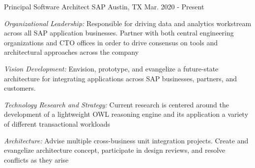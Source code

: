 


\begin{cventries}


\cventry
{Principal Software Architect}
{SAP}
{Austin, TX}
{Mar. 2020 - Present}
{
  \begin{cvitems}
  \item {\emph{Organizational Leadership:} Responsible for driving data and analytics workstream across all SAP application businesses. Partner with both central engineering organizations and CTO offices in order to drive consensus on tools and architectural approaches across the company }
  \item {\emph{Vision Development:} Envision, prototype, and evangelize a future-state architecture for integrating applications across SAP businesses, partners, and customers.}
  \item {\emph{Technology Research and Strategy:} Current research is centered around the development of a lightweight OWL reasoning engine and its application a variety of different transactional workloads }
  \item {\emph{Architecture:} Advise multiple cross-business unit integration projects. Create and evangelize architecture concept, participate in design reviews, and resolve conflicts as they arise }
  \end{cvitems}
}



\end{cventries}
